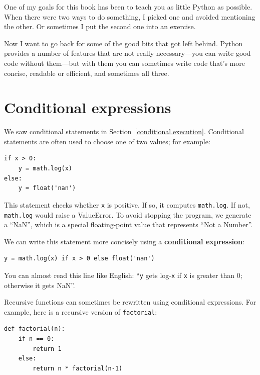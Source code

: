 \documentclass[10pt]{book}
\begin{document}
One of my goals for this book has been to teach you as little Python
as possible.  When there were two ways to do something, I picked 
one and avoided mentioning the other.  Or sometimes I put the second
one into an exercise.

Now I want to go back for some of the good bits that got left behind.
Python provides a number of features that are not really necessary---you
can write good code without them---but with them you can sometimes
write code that's more concise, readable or efficient, and sometimes
all three.


\section{Conditional expressions}

We saw conditional statements in Section~\ref{conditional.execution}.
Conditional statements are often used to choose one of two values;
for example:

\begin{verbatim}
if x > 0:
    y = math.log(x)
else:
    y = float('nan')
\end{verbatim}

This statement checks whether {\tt x} is positive.  If so, it computes
{\tt math.log}.  If not, {\tt math.log} would raise a ValueError.  To
avoid stopping the program, we generate a ``NaN'', which is a special
floating-point value that represents ``Not a Number''.

We can write this statement more concisely using a {\bf conditional
expression}:

\begin{verbatim}
y = math.log(x) if x > 0 else float('nan')
\end{verbatim}

You can almost read this line like English: ``{\tt y} gets log-{\tt x}
if {\tt x} is greater than 0; otherwise it gets NaN''.

Recursive functions can sometimes be rewritten using conditional
expressions.  For example, here is a recursive version of {\tt factorial}:

\begin{verbatim}
def factorial(n):
    if n == 0:
        return 1
    else:
        return n * factorial(n-1)
\end{verbatim}
\end{document}
